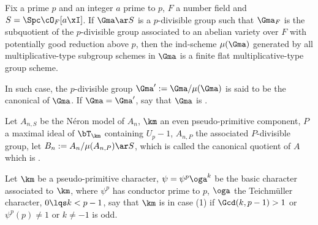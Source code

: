 \documentclass[article, a4paper, twoside]{universal}
\begin{document}
\begin{cmt}
\begin{dfn}
	Fix a prime $p$ and an integer $a$ prime to $p$, $F$ a number field and $S=\Spc\cO_{F}[a\xI]$. If $\Gma\ar S$ is a $p$-divisible group such that $\Gma_{F}$ is the subquotient of the $p$-divisible group associated to an abelian variety over $F$ with potentially good reduction above $p$, then the ind-scheme $\mu(\Gma)$ generated by all multiplicative-type subgroup schemes in $\Gma$ is a finite flat multiplicative-type group scheme.

	In such case, the $p$-divisible group $\Gma':=\Gma/\mu(\Gma)$ is said to be the canonical  of $\Gma$. If $\Gma=\Gma'$, say that $\Gma$ is .
\end{dfn}
Let $A_{n,S}$ be the N{\'e}ron model of $A_{n}$, $\km$ an even pseudo-primitive component, $P$ a maximal ideal of $\bT_{\km}$ containing $U_{p}-1$, $A_{n,P}$ the associated $P$-divisible group, let $B_{n}:=A_{n}/\mu(A_{n,P})\ar S$, which is called the canonical quotient of $A$ which is . 
\end{cmt}

\begin{cmt}

\begin{stp}

	Let $\km$ be a pseudo-primitive character, $\psi=\psi^{p}\oga^{k}$ be the basic character associated to $\km$, where $\psi^{p}$ has conductor prime to $p$, $\oga$ the Teichm{\"u}ller character, $0\lqs k<p-1$, say that $\km$ is in case (1) if $\Gcd(k,p-1)>1$ or $\psi^{p}(p)\neq1$ or $k\neq-1$ is odd.
\end{stp}

\end{cmt}
\end{document}
